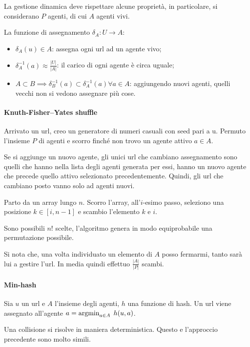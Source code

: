 La gestione dinamica deve rispettare alcune proprietà, in particolare, si considerano
$P$ agenti, di cui $A$ agenti vivi. 

La funzione di assegnamento $\delta_A : U \rightarrow A$:
\begin{itemize}
    \item $\delta_A(u) \in A$: assegna ogni url ad un agente vivo;
    \item $\delta_A^{-1}(a) \approx \frac{|U|}{|A|}$: il carico di 
    ogni agente è circa uguale;
    \item $A \subset B \implies \delta_B^{-1}(a) \subset \delta_A^{-1}(a) \forall a \in A$: 
    aggiungendo nuovi agenti, quelli vecchi non si vedono assegnare più cose.
\end{itemize}



\paragraph{Knuth-Fisher–Yates shuffle}
Arrivato un url, creo un generatore di numeri casuali con seed pari a u. 
Permuto l'insieme $P$ di agenti e scorro finché non trovo un agente attivo $a \in A$.

Se si aggiunge un nuovo agente, gli unici url che cambiano assegnamento 
sono quelli che hanno nella lista degli agenti generata per essi, hanno un  nuovo agente che precede quello attivo selezionato precedentemente.
Quindi, gli url che cambiano posto vanno solo ad agenti nuovi.

Parto da un array lungo $n$.
Scorro l'array, all'$i$-esimo passo, seleziono una posizione $k \in [i, n-1]$ e 
scambio l'elemento $k$ e $i$.

Sono possibili $n!$ scelte, l'algoritmo genera in modo equiprobabile una permutazione possibile.

Si nota che, una volta individuato un elemento di $A$ posso fermarmi, tanto sarà
lui a gestire l'url. 
In media quindi effettuo $\frac{|A|}{|P|}$ scambi.

\paragraph{Min-hash}
Sia $u$ un url e $A$ l'insieme degli agenti, $h$ una funzione di hash. 
Un url viene assegnato all'agente $a = \argmin_{a\in A}\;h(u,a)$.

Una collisione si risolve in maniera deterministica. Questo e l'approccio
precedente sono molto simili.

